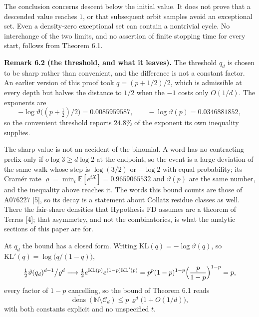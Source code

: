 \documentclass[11pt,a4paper]{article}
\begin{document}
The conclusion concerns descent below the initial value. It does not
prove that a descended value reaches \(1\), or that subsequent orbit
samples avoid an exceptional set. Even a density-zero exceptional set
can contain a nontrivial cycle. No interchange of the two limits, and no
assertion of finite stopping time for every start, follows from Theorem
6.1.

\textbf{Remark 6.2 (the threshold, and what it leaves).} The threshold
\(q_d\) is chosen to be sharp rather than convenient, and the difference
is not a constant factor. An earlier version of this proof took
\(q=(p+1/2)/2\), which is admissible at every depth but halves the
distance to \(1/2\) when the \(-1\) costs only \(O(1/d)\). The exponents
are \[
-\log\vartheta\bigl((p+\tfrac12)/2\bigr)=0.0085959587,\qquad
-\log\vartheta(p)=0.0346881852,
\] so the convenient threshold reports \(24.8\%\) of the exponent its
own inequality supplies.

The sharp value is not an accident of the binomial. A word has no
contracting prefix only if \(o\log3\ge d\log2\) at the endpoint, so the
event is a large deviation of the same walk whose step is \(\log(3/2)\)
or \(-\log2\) with equal probability; its Cram\'{e}r rate
\(\varrho=\min_t\mathbb E[e^{tX}]=0.9659065532\) and \(\vartheta(p)\)
are the same number, and the inequality above reaches it. The words this
bound counts are those of A076227 {[}5{]}, so its decay is a statement
about Collatz residue classes as well. There the fair-share densities
that Hypothesis \(\mathrm{FD}\) assumes are a theorem of Terras {[}4{]};
that asymmetry, and not the combinatorics, is what the analytic sections
of this paper are for.

At \(q_d\) the bound has a closed form. Writing
\(\mathrm{KL}(q)=-\log\vartheta(q)\), so
\(\mathrm{KL}'(q)=\log\bigl(q/(1-q)\bigr)\), \[
\tfrac12\vartheta(q_d)^{d-1}\big/\varrho^{d}
\longrightarrow\tfrac12e^{\mathrm{KL}(p)}e^{(1-p)\mathrm{KL}'(p)}
=p^{p}(1-p)^{1-p}\Bigl(\frac{p}{1-p}\Bigr)^{1-p}=p,
\] every factor of \(1-p\) cancelling, so the bound of Theorem 6.1 reads
\[
\overline{\operatorname{dens}}(\mathbb N\setminus\mathcal C_d)
\le p\,\varrho^{d}\bigl(1+O(1/d)\bigr),
\] with both constants explicit and no unspecified \(t\).
\end{document}
